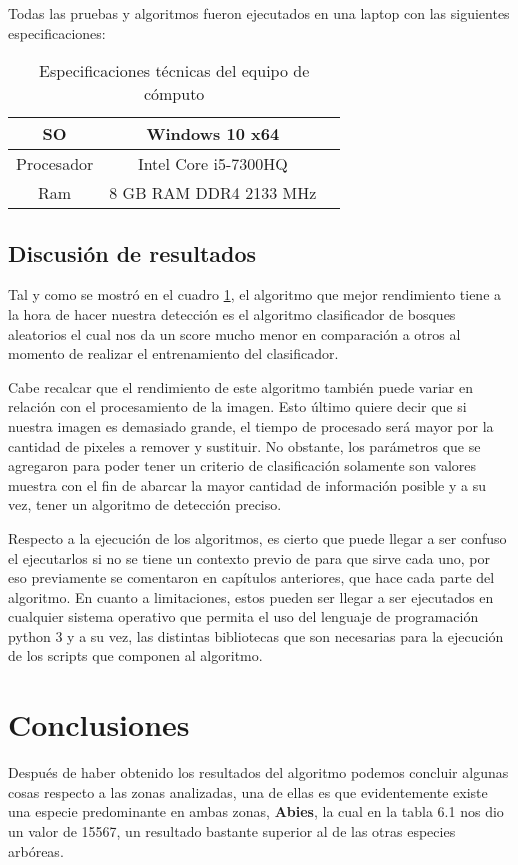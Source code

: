 Todas las pruebas y algoritmos fueron ejecutados en una laptop con las siguientes especificaciones:

\begin{table}[H]
	{\centering
		\begin{tabular}{|c|c|c|}
			\hline
			SO & Windows 10 x64\\
			\hline
			Procesador & Intel Core i5-7300HQ\\
			\hline
			Ram & 8 GB RAM DDR4 2133 MHz\\
			\hline
		\end{tabular}
	\caption{Especificaciones técnicas del equipo de cómputo}
	\label{tab:Especificaciones técnicas del PC}
	}
\end{table}

\break

\section{Discusión de resultados}
Tal y como se mostró en el cuadro \ref{tab:Especificaciones técnicas del PC}, el algoritmo que mejor rendimiento tiene a la hora de hacer nuestra detección es el algoritmo clasificador de bosques aleatorios el cual nos da un score mucho menor en comparación a otros al momento de realizar el entrenamiento del clasificador.

Cabe recalcar que el rendimiento de este algoritmo también puede variar en relación con el procesamiento de la imagen. Esto último quiere decir que si nuestra imagen es demasiado grande, el tiempo de procesado será mayor por la cantidad de pixeles a remover y sustituir. 
No obstante, los parámetros que se agregaron para poder tener un criterio de clasificación solamente son valores muestra con el fin de abarcar la mayor cantidad de información posible y a su vez, tener un algoritmo de detección preciso.

Respecto a la ejecución de los algoritmos, es cierto que puede llegar a ser confuso el ejecutarlos si no se tiene un contexto previo de para que sirve cada uno, por eso previamente se comentaron en capítulos anteriores, que hace cada parte del algoritmo. En cuanto a limitaciones, estos pueden ser llegar a ser ejecutados en cualquier sistema operativo que permita el uso del lenguaje de programación python 3 y a su vez, las distintas bibliotecas que son necesarias para la ejecución de los scripts que componen al algoritmo.


\chapter{Conclusiones}
Después de haber obtenido los resultados del algoritmo podemos concluir algunas cosas respecto a las zonas analizadas, una de ellas es que evidentemente existe una especie predominante en ambas zonas, \textbf{Abies}, la cual en la tabla 6.1 nos dio un valor de 15567, un resultado bastante superior al de las otras especies arbóreas.

